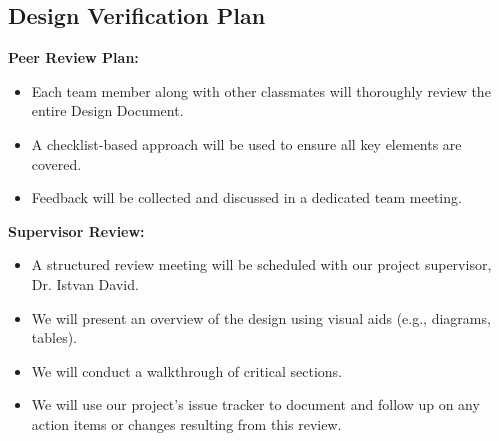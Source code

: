 \documentclass[12pt, titlepage]{article}
\begin{document}
\subsection{Design Verification Plan}

\textbf{Peer Review Plan:}
\begin{itemize}
    \item Each team member along with other classmates will thoroughly review the entire Design Document.
    \item A checklist-based approach will be used to ensure all key elements are covered.
    \item Feedback will be collected and discussed in a dedicated team meeting.
\end{itemize}

\textbf{Supervisor Review:}
\begin{itemize}
    \item A structured review meeting will be scheduled with our project supervisor, Dr. Istvan David.
    \item We will present an overview of the design using visual aids (e.g., diagrams, tables).
    \item We will conduct a walkthrough of critical sections.
    \item We will use our project's issue tracker to document and follow up on any action items or changes resulting from this review.
\end{itemize}
\end{document}
